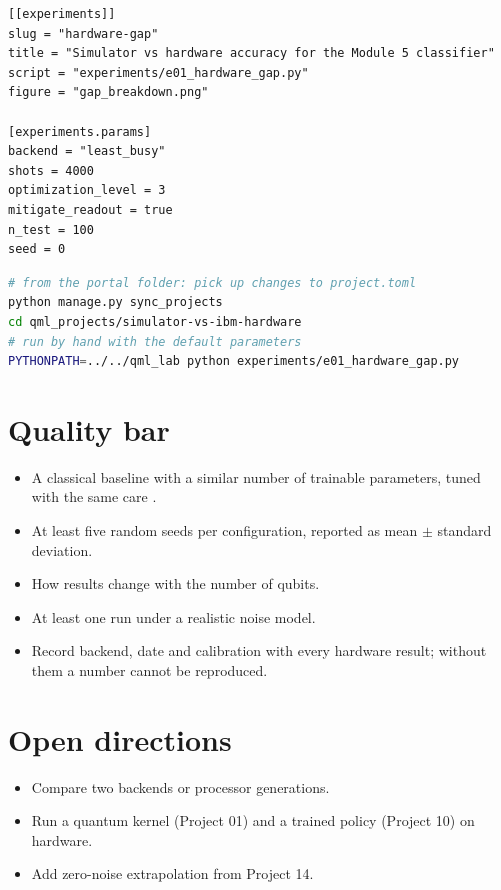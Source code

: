 \documentclass[11pt,a4paper]{article}
\begin{document}
\begin{lstlisting}[language={}]
[[experiments]]
slug = "hardware-gap"
title = "Simulator vs hardware accuracy for the Module 5 classifier"
script = "experiments/e01_hardware_gap.py"
figure = "gap_breakdown.png"

[experiments.params]
backend = "least_busy"
shots = 4000
optimization_level = 3
mitigate_readout = true
n_test = 100
seed = 0
\end{lstlisting}

\begin{lstlisting}[language=bash]
# from the portal folder: pick up changes to project.toml
python manage.py sync_projects
cd qml_projects/simulator-vs-ibm-hardware
# run by hand with the default parameters
PYTHONPATH=../../qml_lab python experiments/e01_hardware_gap.py
\end{lstlisting}

\section{Quality bar}
\begin{itemize}
  \item A classical baseline with a similar number of trainable parameters, tuned with the same care \citep{bowles2024}.
  \item At least five random seeds per configuration, reported as mean $\pm$ standard deviation.
  \item How results change with the number of qubits.
  \item At least one run under a realistic noise model.
  \item Record backend, date and calibration with every hardware result; without them a number cannot be reproduced.
\end{itemize}

\section{Open directions}
\begin{itemize}
  \item Compare two backends or processor generations.
  \item Run a quantum kernel (Project 01) and a trained policy (Project 10) on hardware.
  \item Add zero-noise extrapolation from Project 14.
\end{itemize}
\end{document}
